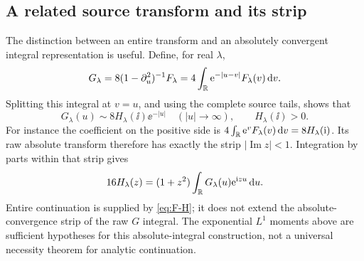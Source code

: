 \subsection{A related source transform and its strip}
The distinction between an entire transform and an absolutely convergent
integral representation is useful. Define, for real \(\lambda\),
\[
 G_\lambda=8(1-\partial_u^2)^{-1}F_\lambda
 =4\int_\mathbb R\mathrm e^{-|u-v|}F_\lambda(v)\,\mathrm d v.
\]
Splitting this integral at \(v=u\), and using the complete source tails,
shows that
\begin{equation}\label{eq:G-tail}
 G_\lambda(u)\sim 8H_\lambda(\ii)\ee^{-|u|}
 \quad (|u|\to\infty),\qquad H_\lambda(\ii)>0.
\end{equation}
For instance the coefficient on the positive side is
\(4\int_\mathbb R\mathrm e^vF_\lambda(v)\,\mathrm d v=8H_\lambda(\mathrm i)\).
Its raw absolute transform therefore has exactly the strip
\(|\operatorname{Im}z|<1\). Integration by parts within that strip gives
\begin{equation}\label{eq:G-transform}
 16H_\lambda(z)=(1+z^2)\int_\mathbb R G_\lambda(u)\mathrm e^{\mathrm i zu}\,\mathrm d u.
\end{equation}
Entire continuation is supplied by \eqref{eq:F-H}; it does not extend
the absolute-convergence strip of the raw \(G\) integral. The exponential
\(L^1\) moments above are sufficient hypotheses for this absolute-integral
construction, not a universal necessity theorem for analytic continuation.
